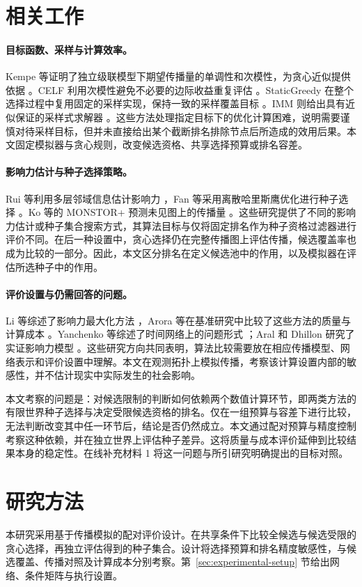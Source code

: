 \documentclass[smallextended]{svjour3}
\begin{document}
\section{相关工作}
\paragraph{目标函数、采样与计算效率。}Kempe 等证明了独立级联模型下期望传播量的单调性和次模性，为贪心近似提供依据 \cite{ref1}。CELF 利用次模性避免不必要的边际收益重复评估 \cite{ref7}。StaticGreedy 在整个选择过程中复用固定的采样实现，保持一致的采样覆盖目标 \cite{ref8}。IMM 则给出具有近似保证的采样式求解器 \cite{ref2}。这些方法处理指定目标下的优化计算困难，说明需要谨慎对待采样目标，但并未直接给出某个截断排名排除节点后所造成的效用后果。本文固定模拟器与贪心规则，改变候选资格、共享选择预算或排名容差。

\paragraph{影响力估计与种子选择策略。}Rui 等利用多层邻域信息估计影响力 \cite{ref12}，Fan 等采用离散哈里斯鹰优化进行种子选择 \cite{ref13}。Ko 等的 MONSTOR+ 预测未见图上的传播量 \cite{ref19}。这些研究提供了不同的影响力估计或种子集合搜索方式，其算法目标与仅将固定排名作为种子资格过滤器进行评价不同。在后一种设置中，贪心选择仍在完整传播图上评估传播，候选覆盖率也成为比较的一部分。因此，本文区分排名在定义候选池中的作用，以及模拟器在评估所选种子中的作用。

\paragraph{评价设置与仍需回答的问题。}Li 等综述了影响力最大化方法 \cite{ref9}，Arora 等在基准研究中比较了这些方法的质量与计算成本 \cite{ref16}。Yanchenko 等综述了时间网络上的问题形式 \cite{ref11}；Aral 和 Dhillon 研究了实证影响力模型 \cite{ref15}。这些研究方向共同表明，算法比较需要放在相应传播模型、网络表示和评价设置中理解。本文在观测拓扑上模拟传播，考察该计算设置内部的敏感性，并不估计现实中实际发生的社会影响。

本文考察的问题是：对候选限制的判断如何依赖两个数值计算环节，即两类方法的有限世界种子选择与决定受限候选资格的排名。仅在一组预算与容差下进行比较，无法判断改变其中任一环节后，结论是否仍然成立。本文通过配对预算与精度控制考察这种依赖，并在独立世界上评估种子差异。这将质量与成本评价延伸到比较结果本身的稳定性。在线补充材料 1 将这一问题与所引研究明确提出的目标对照。

\section{研究方法}
本研究采用基于传播模拟的配对评价设计。在共享条件下比较全候选与候选受限的贪心选择，再独立评估得到的种子集合。设计将选择预算和排名精度敏感性，与候选覆盖、传播对照及计算成本分别考察。第~\ref{sec:experimental-setup} 节给出网络、条件矩阵与执行设置。
\end{document}
